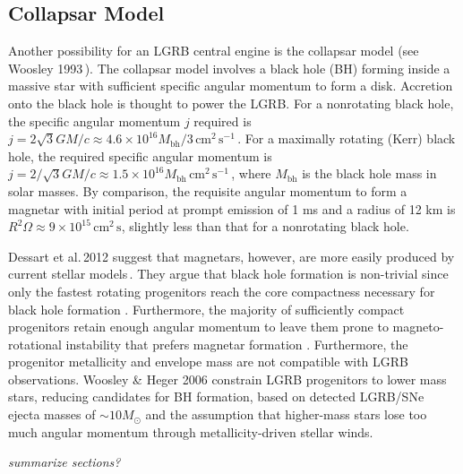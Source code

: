\documentclass{article}
\begin{document}
\subsection{Collapsar Model}

Another possibility for an LGRB central engine is the collapsar model (see Woosley 1993\,\cite{Woosley:1993ap}). The collapsar model involves a black hole (BH) forming inside a massive star with sufficient specific angular momentum to form a disk. Accretion onto the black hole is thought to power the LGRB. For a nonrotating black hole, the specific angular momentum $j$ required is $j=2 \sqrt{3} GM/c\approx 4.6 \times 10^{16} M_{\mathrm{bh}}/3\,\mathrm{cm}^2\,\mathrm{s}^{-1}$\,\cite{Woosley:2006fn}. For a maximally rotating (Kerr) black hole, the required specific angular momentum is $j=2/\sqrt{3} GM/c \approx 1.5 \times 10^{16} M_{\mathrm{bh}}\,\mathrm{cm}^2\,\mathrm{s}^{-1}$\,\cite{Woosley:2006fn}, where $M_{\mathrm{bh}}$ is the black hole mass in solar masses.  By comparison, the requisite angular momentum to form a magnetar with initial period at prompt emission of 1 ms and a radius of 12 km is $R^2 \Omega \approx 9 \times 10^{15}$\,$\mathrm{cm}^2\,\mathrm{s}$, slightly less than that for a nonrotating black hole.

Dessart et al.\,2012 suggest that magnetars, however, are more easily produced by current stellar models\,\cite{Dessart:2012ap}. They argue that black hole formation is non-trivial since only the fastest rotating progenitors reach the core compactness necessary for black hole formation \cite{Dessart:2012ap}. Furthermore, the majority of sufficiently compact progenitors retain enough angular momentum to leave them prone to magneto-rotational instability that prefers magnetar formation \cite{Dessart:2012ap}. Furthermore, the progenitor metallicity and envelope mass are not compatible with LGRB observations. Woosley \& Heger 2006 \cite{Woosley:2005gy} constrain LGRB progenitors to lower mass stars, reducing candidates for BH formation, based on detected LGRB/SNe ejecta masses of $\sim 10 M_{\odot}$ and the assumption that higher-mass stars lose too much angular momentum through metallicity-driven stellar winds.

\textit{summarize sections?}
\end{document}
